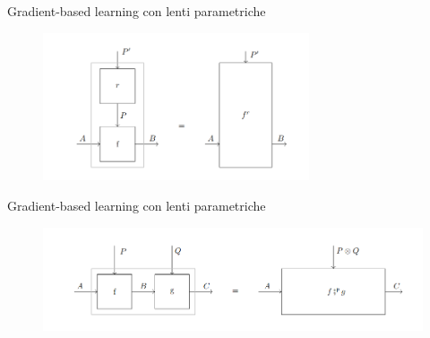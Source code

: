 \documentclass{beamer}
\begin{document}
\begin{frame}{Gradient-based learning con lenti parametriche}
    \begin{figure}
        \begin{center}
            \includegraphics[width=0.7\textwidth]{figures/para_reparametrization.png}
            \caption*{}
        \end{center}
    \end{figure}
\end{frame}

\begin{frame}{Gradient-based learning con lenti parametriche}
    \begin{figure}
        \begin{center}
            \includegraphics[width=\textwidth]{figures/para_composition.png}
            \caption*{}
        \end{center}
    \end{figure}
\end{frame}
\end{document}

